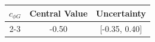 
\begin{tabular}{|c|c|c|}
\hline
\multirow{2}{*}{\textbf{$c_{\phi G}$}} & \textbf{Central Value} & \textbf{Uncertainty} \\
\cline{2-3}
& -0.50 & [-0.35, 0.40] \\
\hline
\end{tabular}
